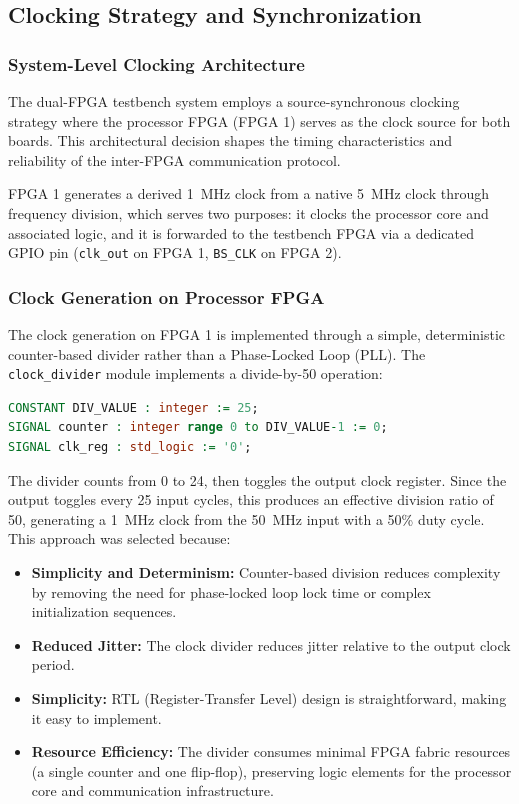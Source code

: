 \documentclass[12pt]{article}
\begin{document}
\FloatBarrier

\newpage

\subsection{Clocking Strategy and Synchronization}

\subsubsection{System-Level Clocking Architecture}
The dual-FPGA testbench system employs a source-synchronous clocking strategy where the processor FPGA (FPGA 1) serves as the clock source for both boards. This architectural decision shapes the timing characteristics and reliability of the inter-FPGA communication protocol.

FPGA 1 generates a derived 1~MHz clock from a native 5~MHz clock through frequency division, which serves two purposes: it clocks the processor core and associated logic, and it is forwarded to the testbench FPGA via a dedicated GPIO pin (\texttt{clk\_out} on FPGA 1, \texttt{BS\_CLK} on FPGA 2).

\subsubsection{Clock Generation on Processor FPGA}
The clock generation on FPGA 1 is implemented through a simple, deterministic counter-based divider rather than a Phase-Locked Loop (PLL). The \texttt{clock\_divider} module implements a divide-by-50 operation:

\begin{lstlisting}[language=VHDL]
CONSTANT DIV_VALUE : integer := 25;
SIGNAL counter : integer range 0 to DIV_VALUE-1 := 0;
SIGNAL clk_reg : std_logic := '0';
\end{lstlisting}

The divider counts from 0 to 24, then toggles the output clock register. Since the output toggles every 25 input cycles, this produces an effective division ratio of 50, generating a 1~MHz clock from the 50~MHz input with a 50\% duty cycle. This approach was selected because:

\begin{itemize}
    \item \textbf{Simplicity and Determinism:} Counter-based division reduces complexity by removing the need for phase-locked loop lock time or complex initialization sequences.
    \item \textbf{Reduced Jitter:} The clock divider reduces jitter relative to the output clock period.
    \item \textbf{Simplicity:} RTL (Register-Transfer Level) design is straightforward, making it easy to implement.
    \item \textbf{Resource Efficiency:} The divider consumes minimal FPGA fabric resources (a single counter and one flip-flop), preserving logic elements for the processor core and communication infrastructure.
\end{itemize}
\end{document}
